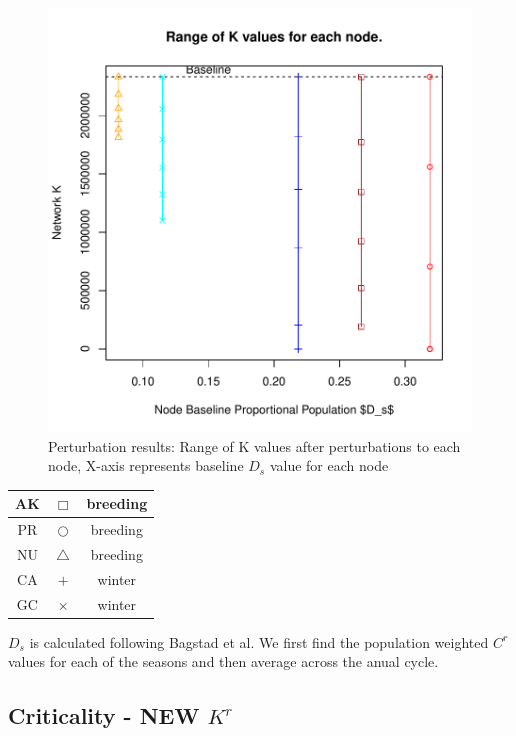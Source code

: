 \documentclass[10pt]{article}
\begin{document}
\vspace{-.5cm}
\begin{figure}[H]
\begin{center}
\includegraphics[width=.8\textwidth, height=.8\textwidth]{RGraphics-pintail_barcr_DS}
\caption{Perturbation results: Range of K values after perturbations to each node, X-axis represents baseline $D_s$ value for each node}\label{fig:pintail_barcr_DS}
\end{center}
\end{figure}

\vspace{-.5cm}
\begin{tabular}{|c|c|c|}
\hline
{\color{Sepia}AK} & $\Box$ & breeding \\
\hline
{\color{red}PR} & $\bigcirc$ & breeding \\
\hline
{\color{orange}NU} & $\triangle$ & breeding \\
\hline
{\color{blue}CA} & $+$ & winter \\
\hline
{\color{cyan}GC} & $\times$ & winter \\
\hline
\end{tabular}

\vspace{1cm}
$D_s$ is calculated following Bagstad et al. We first find the population weighted $C^r$ values for each of the seasons and then average across the anual cycle.

\newpage
\subsection{Criticality - NEW \texorpdfstring{$K^r$}{KR}}
\end{document}
